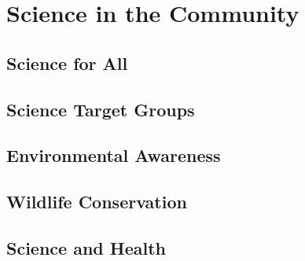 \chapter{Science in the Community}


\section{Science for All}


\section{Science Target Groups}


\section{Environmental Awareness}


\section{Wildlife Conservation}


\section{Science and Health}
